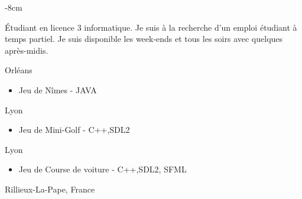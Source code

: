 \documentclass[10pt,a4paper]{altacv}
\begin{document}
  \tagline{  }

\begin{adjustwidth}{}{-8cm}
\makecvheader
\end{adjustwidth}

Étudiant en licence 3 informatique. Je suis à la recherche d'un emploi étudiant à temps partiel. Je suis disponible les week-ends et tous les soirs avec quelques après-midis.

\divider
{} {Orléans}
\begin{itemize}
\item Jeu de Nîmes - JAVA
\end{itemize}

 {Lyon}
\begin{itemize}
\item Jeu de Mini-Golf - C++,SDL2
\end{itemize}

 {Lyon}
\begin{itemize}
\item Jeu de Course de voiture - C++,SDL2, SFML
\end{itemize}


\divider
{} {Rillieux-La-Pape, France}
\end{document}
